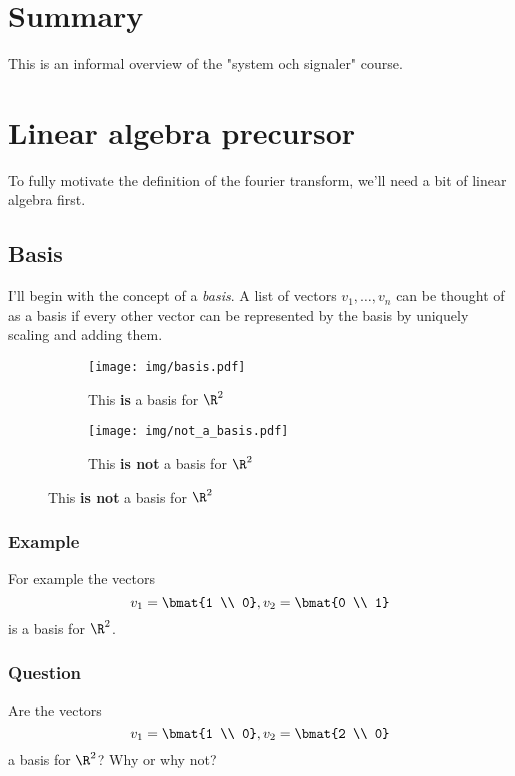 \documentclass{article}
\newcommand{\0}{{\mathbf{0}}}
\begin{document}


\section{Summary}
This is an informal overview of the "system och signaler" course.

\section{Linear algebra precursor}
To fully motivate the definition of the fourier transform, we'll need
a bit of linear algebra first.

\subsection{Basis}
I'll begin with the concept of a \textit{basis}.
A list of vectors $v_1,\dots,v_n$ can be thought of as a basis
if every other vector can be represented by the basis
by uniquely scaling and adding them.

\begin{figure}[h!]
  \centering
  \begin{subfigure}[b]{0.4\textwidth}
    \texttt{[image: img/basis.pdf]}
    \caption{This \textbf{is} a basis for $\R^2$}
  \end{subfigure}%
  \begin{subfigure}[b]{0.4\textwidth}
    \texttt{[image: img/not\_a\_basis.pdf]}
    \caption{This \textbf{is not} a basis for $\R^2$}
  \end{subfigure}
\end{figure}


\subsubsection{Example}
For example the vectors
$$ v_1 = \bmat{1 \\ 0}, v_2 = \bmat{0 \\ 1} $$
is a basis for $\R^2$.

\subsubsection{Question}
Are the vectors
$$ v_1 = \bmat{1 \\ 0}, v_2 = \bmat{2 \\ 0} $$
a basis for $\R^2$? Why or why not?
\end{document}
